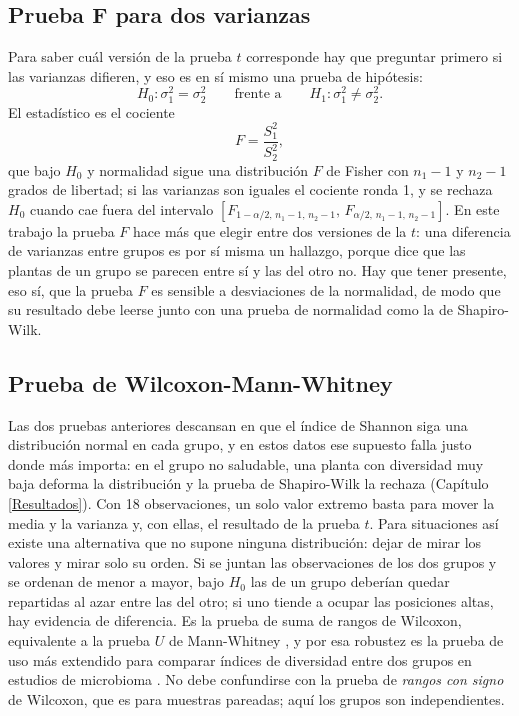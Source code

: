 \subsection{Prueba F para dos varianzas}
Para saber cuál versión de la prueba $t$ corresponde hay que preguntar primero si las varianzas
difieren, y eso es en sí mismo una prueba de hipótesis:
\begin{equation}
H_{0} : \sigma_{1}^{2} = \sigma_{2}^{2} \qquad \text{frente a} \qquad H_{1} : \sigma_{1}^{2} \neq \sigma_{2}^{2}.
\label{eq:hip-varianzas}
\end{equation}
El estadístico es el cociente
\begin{equation}
F = \frac{S_{1}^{2}}{S_{2}^{2}},
\label{eq:estadistico-f}
\end{equation}
que bajo $H_0$ y normalidad sigue una distribución $F$ de Fisher con $n_1 - 1$ y $n_2 - 1$ grados
de libertad; si las varianzas son iguales el cociente ronda 1, y se rechaza $H_0$ cuando cae fuera
del intervalo $[F_{1-\alpha/2,\, n_1-1,\, n_2-1},\, F_{\alpha/2,\, n_1-1,\, n_2-1}]$. En este trabajo
la prueba $F$ hace más que elegir entre dos versiones de la $t$: una diferencia de varianzas entre
grupos es por sí misma un hallazgo, porque dice que las plantas de un grupo se parecen entre sí y
las del otro no. Hay que tener presente, eso sí, que la prueba $F$ es sensible a desviaciones de la
normalidad, de modo que su resultado debe leerse junto con una prueba de normalidad como la de
Shapiro-Wilk.

\subsection{Prueba de Wilcoxon-Mann-Whitney}
Las dos pruebas anteriores descansan en que el índice de Shannon siga una distribución normal en
cada grupo, y en estos datos ese supuesto falla justo donde más importa: en el grupo no saludable,
una planta con diversidad muy baja deforma la distribución y la prueba de Shapiro-Wilk la rechaza
(Capítulo \ref{Resultados}). Con 18 observaciones, un solo valor extremo basta para mover la media y
la varianza y, con ellas, el resultado de la prueba $t$. Para situaciones así existe una alternativa
que no supone ninguna distribución: dejar de mirar los valores y mirar solo su orden. Si se juntan
las observaciones de los dos grupos y se ordenan de menor a mayor, bajo $H_0$ las de un grupo
deberían quedar repartidas al azar entre las del otro; si uno tiende a ocupar las posiciones altas,
hay evidencia de diferencia. Es la prueba de suma de rangos de Wilcoxon, equivalente a la prueba
$U$ de Mann-Whitney \citep{wilcoxon1945individual, mann1947test}, y por esa robustez es la prueba de
uso más extendido para comparar índices de diversidad entre dos grupos en estudios de microbioma
\citep{aldirawi2023univariate}. No debe confundirse con la prueba de \emph{rangos con signo} de
Wilcoxon, que es para muestras pareadas; aquí los grupos son independientes.

